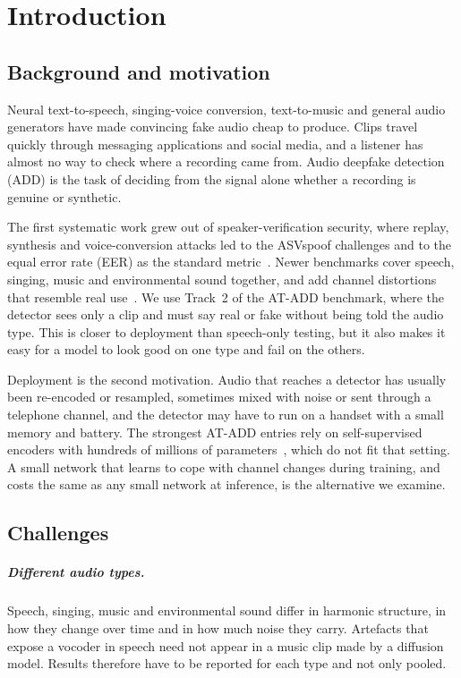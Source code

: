 \documentclass[12pt,a4paper]{report}
\begin{document}
\chapter{Introduction}
\label{ch:introduction}

\section{Background and motivation}

Neural text-to-speech, singing-voice conversion, text-to-music and general audio generators have made convincing fake audio cheap to produce. Clips travel quickly through messaging applications and social media, and a listener has almost no way to check where a recording came from. Audio deepfake detection (ADD) is the task of deciding from the signal alone whether a recording is genuine or synthetic.

The first systematic work grew out of speaker-verification security, where replay, synthesis and voice-conversion attacks led to the ASVspoof challenges and to the equal error rate (EER) as the standard metric~\cite{kinnunen2017detection,wang2020asvspoof}. Newer benchmarks cover speech, singing, music and environmental sound together, and add channel distortions that resemble real use~\cite{xie2026atadd}. We use Track~2 of the AT-ADD benchmark, where the detector sees only a clip and must say real or fake without being told the audio type. This is closer to deployment than speech-only testing, but it also makes it easy for a model to look good on one type and fail on the others.

Deployment is the second motivation. Audio that reaches a detector has usually been re-encoded or resampled, sometimes mixed with noise or sent through a telephone channel, and the detector may have to run on a handset with a small memory and battery. The strongest AT-ADD entries rely on self-supervised encoders with hundreds of millions of parameters~\cite{xie2026atadd,fan2026dualssl}, which do not fit that setting. A small network that learns to cope with channel changes during training, and costs the same as any small network at inference, is the alternative we examine.

\section{Challenges}

\paragraph{Different audio types.} Speech, singing, music and environmental sound differ in harmonic structure, in how they change over time and in how much noise they carry. Artefacts that expose a vocoder in speech need not appear in a music clip made by a diffusion model. Results therefore have to be reported for each type and not only pooled.
\end{document}
